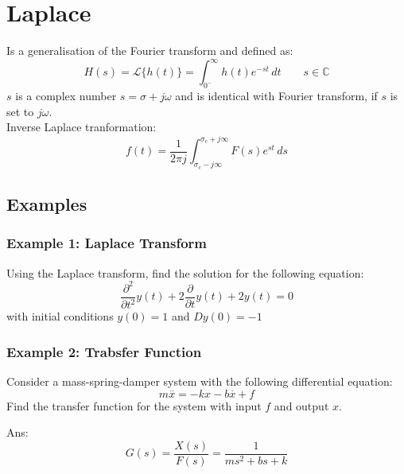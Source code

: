 \section{Laplace}
Is a generalisation of the Fourier transform and defined as:
$$H(s)=\mathcal{L}\{h(t)\}=\int_{0^-}^{\infty}h(t)e^{ -st }  \, dt \quad\quad s \in\mathbb{C}$$
$s$ is a complex number $s=\sigma+j\omega$ and is identical with Fourier transform, if $s$ is set to $j\omega$.\\
Inverse Laplace tranformation:
$$f(t)=\frac{1}{2\pi j}\int_{\sigma_{c}-j\infty}^{\sigma_{c}+j\infty} F(s)e^{ st } \, ds $$
\subsection{Examples}
\subsubsection{Example 1: Laplace Transform}
Using the Laplace transform, find the solution for the following equation:
$$\frac{\partial^{2}}{\partial t^{2}}y(t)+2\frac{\partial}{\partial t}y(t)+2y(t)=0$$
with initial conditions $y (0) = 1$ and $Dy (0) = -1$
\subsubsection{Example 2: Trabsfer Function}
Consider a mass-spring-damper system with the following differential equation:
$$m\overset{..}{x}=-kx-b\overset{.}{x}+f$$
Find the transfer function for the system with input $f$ and output $x$.

Ans:
$$G(s)=\frac{X(s)}{F(s)}=\frac{1}{ms^{2}+bs+k}$$
